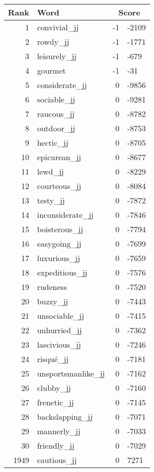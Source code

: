 \begin{longtable}[!htbp]{| rlr@{.}l |}
    \hline
    \textbf{Rank} & \textbf{Word} & \multicolumn{2}{c|}{\textbf{Score}} \\
    \hline
    \endhead
    1 & convivial\_jj & -1 & -2109 \\
    2 & rowdy\_jj & -1 & -1771 \\
    3 & leisurely\_jj & -1 & -679 \\
    4 & gourmet & -1 & -31 \\
    5 & considerate\_jj & 0 & -9856 \\
    6 & sociable\_jj & 0 & -9281 \\
    7 & raucous\_jj & 0 & -8782 \\
    8 & outdoor\_jj & 0 & -8753 \\
    9 & hectic\_jj & 0 & -8705 \\
    10 & epicurean\_jj & 0 & -8677 \\
    11 & lewd\_jj & 0 & -8229 \\
    12 & courteous\_jj & 0 & -8084 \\
    13 & testy\_jj & 0 & -7872 \\
    14 & inconsiderate\_jj & 0 & -7846 \\
    15 & boisterous\_jj & 0 & -7794 \\
    16 & easygoing\_jj & 0 & -7699 \\
    17 & luxurious\_jj & 0 & -7659 \\
    18 & expeditious\_jj & 0 & -7576 \\
    19 & rudeness & 0 & -7520 \\
    20 & buzzy\_jj & 0 & -7443 \\
    21 & unsociable\_jj & 0 & -7415 \\
    22 & unhurried\_jj & 0 & -7362 \\
    23 & lascivious\_jj & 0 & -7246 \\
    24 & risqué\_jj & 0 & -7181 \\
    25 & unsportsmanlike\_jj & 0 & -7162 \\
    26 & clubby\_jj & 0 & -7160 \\
    27 & frenetic\_jj & 0 & -7145 \\
    28 & backslapping\_jj & 0 & -7071 \\
    29 & mannerly\_jj & 0 & -7033 \\
    30 & friendly\_jj & 0 & -7029 \\
    1949 & cautious\_jj & 0 & 7271 \\

\end{longtable}
